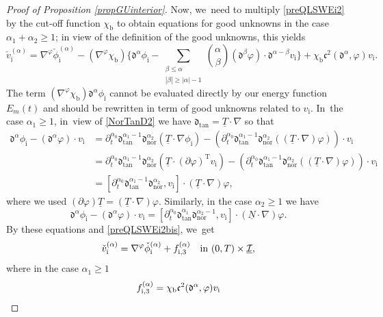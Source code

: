 \documentclass[JEP,XML,SOM,Unicode,NoFloatCountersInSection,published]{cedram}
\newcommand{\dtan}{{\mathfrak d}_\mathrm{tan}}
\newcommand{\dnor}{{\mathfrak d}_\mathrm{nor}}
\newcommand{\dt}{\partial_t}
\newcommand{\cI}{{\mathcal I}}
\newcommand{\ul}[1]{\underline{#1}}
\theoremstyle{definition}
\begin{document}
\begin{proof}[Proof of Proposition \ref{propGUinterior}]
Now, we~need to multiply \eqref{preQLSWEi2} by the cut-off function $\chi_\mathrm{b}$ to obtain equations for good unknowns in the case $\alpha_1+\alpha_2\geq1$;
in view of the definition of the good unknowns, this yields
\begin{equation}\label{preQLSWEi2bis}
\check{v}_\mathrm{i}^{(\alpha)}=\nabla^\varphi \check\phi_\mathrm{i}^{(\alpha)}-(\nabla^\varphi \chi_\mathrm{b})
\biggl\{ \mathfrak{d}^{\alpha}\phi_\mathrm{i}
- \sum_{\substack{\beta\leq\alpha\\ |\beta|\geq|\alpha|-1}} \binom{\alpha}{\beta}
(\mathfrak{d}^{\beta}\varphi)\cdot\mathfrak{d}^{\alpha-\beta}v_\mathrm{i} \biggr\} + \chi_\mathrm{b}{\mathfrak c}^2(\mathfrak{d}^\alpha,\varphi)v_\mathrm{i}.
\end{equation}
The term $(\nabla^\varphi\chi_\mathrm{b})\mathfrak{d}^{\alpha}\phi_\mathrm{i}$ cannot be evaluated directly by our energy
function $E_m(t)$ and should be rewritten in term of good unknowns related to $v_\mathrm{i}$. In~the case $\alpha_1\geq1$, in~view of \eqref{NorTanD2} we have $\dtan=\ul{T}\cdot\nabla$ so that
\begin{align*}
\mathfrak{d}^{\alpha}\phi_\mathrm{i} - (\mathfrak{d}^{\alpha}\varphi)\cdot v_\mathrm{i}
&= \dt^{\alpha_0}\dtan^{\alpha_1-1}\dnor^{\alpha_2}(\ul{T}\cdot\nabla\phi_\mathrm{i})
- (\dt^{\alpha_0}\dtan^{\alpha_1-1}\dnor^{\alpha_2}((\ul{T}\cdot\nabla)\varphi))\cdot v_\mathrm{i} \\
&= \dt^{\alpha_0}\dtan^{\alpha_1-1}\dnor^{\alpha_2}(\ul{T}\cdot(\partial\varphi)^\mathrm{T}v_\mathrm{i})
- (\dt^{\alpha_0}\dtan^{\alpha_1-1}\dnor^{\alpha_2}((\ul{T}\cdot\nabla)\varphi))\cdot v_\mathrm{i} \nonumber \\
&= [\dt^{\alpha_0}\dtan^{\alpha_1-1}\dnor^{\alpha_2},v_\mathrm{i}]\cdot(\ul{T}\cdot\nabla)\varphi, \nonumber
\end{align*}
where we used $(\partial\varphi)\ul{T}=(\ul{T}\cdot\nabla)\varphi$.
Similarly, in the case $\alpha_2\geq1$ we have
\[
\mathfrak{d}^{\alpha}\phi_\mathrm{i} - (\mathfrak{d}^{\alpha}\varphi)\cdot v_\mathrm{i}
= [\dt^{\alpha_0}\dtan^{\alpha_1}\dnor^{\alpha_2-1},v_\mathrm{i}]\cdot(\ul{N}\cdot\nabla)\varphi.
\]
By these equations and \eqref{preQLSWEi2bis}, we~get
\[
\check{v}_\mathrm{i}^{(\alpha)} = \nabla^\varphi\check{\phi}_\mathrm{i}^{(\alpha)} + f_{{\rm i},3}^{(\alpha)} \quad\text{in } (0,T)\times\ul{\cI},
\]
where in the case $\alpha_1\geq1$
\begin{multline}\label{deffi3}
f_{{\rm i},3}^{(\alpha)}
= \chi_\mathrm{b} \mathfrak{c}^2(\mathfrak{d}^\alpha,\varphi)v_\mathrm{i} \\

\end{multline}
\end{proof}
\end{document}
